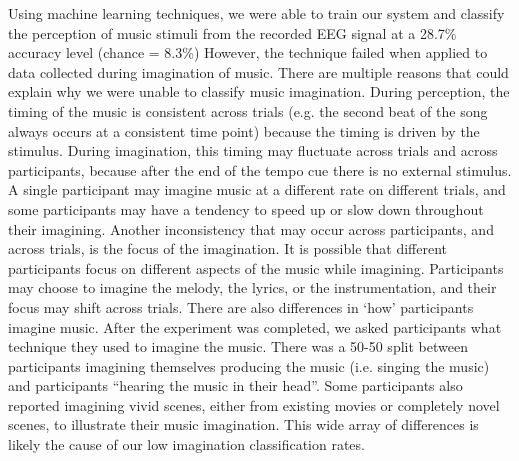 Using machine learning techniques, we were able to train our system and classify the perception of music stimuli from the recorded EEG signal at a 28.7\% accuracy level (chance = 8.3\%)
However, the technique failed when applied to data collected during imagination of music.
There are multiple reasons that could explain why we were unable to classify music imagination.
During perception, the timing of the music is consistent across trials (e.g. the second beat of the song always occurs at a consistent time point) because the timing is driven by the stimulus. 
During imagination, this timing may fluctuate across trials and across participants, because after the end of the tempo cue there is no external stimulus.
A single participant may imagine music at a different rate on different trials, and some participants may have a tendency to speed up or slow down throughout their imagining. 
Another inconsistency that may occur across participants, and across trials, is the focus of the imagination. 
It is possible that different participants focus on different aspects of the music while imagining.
Participants may choose to imagine the melody, the lyrics, or the instrumentation, and their focus may shift across trials.
There are also differences in `how' participants imagine music. 
After the experiment was completed, we asked participants what technique they used to imagine the music.
There was a 50-50 split between participants imagining themselves producing the music (i.e. singing the music) and participants ``hearing the music in their head''. 
Some participants also reported imagining vivid scenes, either from existing movies or completely novel scenes, to illustrate their music imagination.
This wide array of differences is likely the cause of our low imagination classification rates. 


